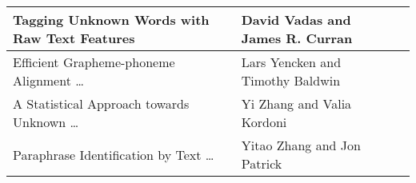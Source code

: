 \documentclass{article}
\begin{document}
\begin{center}
\begin{tabular}{|p{}|p{}||p{}|}
Tagging Unknown Words with Raw Text Features &
David Vadas and James R. Curran &
\\ \hline

Efficient Grapheme-phoneme Alignment \ldots &
Lars Yencken and Timothy Baldwin &
\\ \hline

A Statistical Approach towards Unknown \ldots &
Yi Zhang and Valia Kordoni &
\\ \hline

Paraphrase Identification by Text \ldots &
Yitao Zhang and Jon Patrick &
\\ \hline

\end{tabular}
\end{center}
\end{document}

